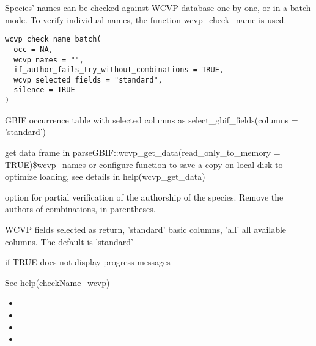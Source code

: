 \documentclass[a4paper]{book}
\begin{document}
%
\begin{Description}
Species’ names can be checked against WCVP database one by one, or in a batch mode.
To verify individual names, the function wcvp\_check\_name is used.
\end{Description}
%
\begin{Usage}
\begin{verbatim}
wcvp_check_name_batch(
  occ = NA,
  wcvp_names = "",
  if_author_fails_try_without_combinations = TRUE,
  wcvp_selected_fields = "standard",
  silence = TRUE
)
\end{verbatim}
\end{Usage}
%
\begin{Arguments}
\begin{ldescription}
\item[\code{occ}] GBIF occurrence table with selected columns as select\_gbif\_fields(columns = 'standard')

\item[\code{wcvp\_names}] get data frame in parseGBIF::wcvp\_get\_data(read\_only\_to\_memory = TRUE)\$wcvp\_names
or configure function to save a copy on local disk to optimize loading, see details in help(wcvp\_get\_data)

\item[\code{if\_author\_fails\_try\_without\_combinations}] option for partial verification of the authorship of the species.
Remove the authors of combinations, in parentheses.

\item[\code{wcvp\_selected\_fields}] WCVP fields selected as return, 'standard' basic columns, 'all' all available columns.
The default is 'standard'

\item[\code{silence}] if TRUE does not display progress messages
\end{ldescription}
\end{Arguments}
%
\begin{Details}
See help(checkName\_wcvp)
\begin{itemize}

\item{} 
\item{} 
\item{} 
\item{} 

\end{itemize}

\end{Details}
\end{document}
